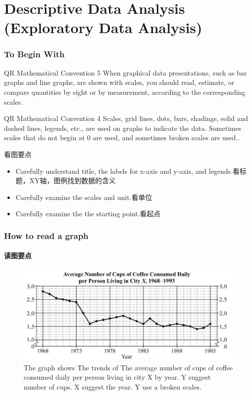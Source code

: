 \documentclass[
	11pt, %
	handout,
]{beamer}
\begin{document}

\section{Descriptive Data Analysis (Exploratory Data Analysis)}

\begin{frame}
	\frametitle{To Begin With} %

	\begin{block}{QR Mathematical Convention 5}
		When graphical data presentations, such as bar graphs and line graphs,
are shown with scales, you should read, estimate, or compare quantities
by sight or by measurement, according to the corresponding scales.
	\end{block}

		\begin{block}{QR Mathematical Convention 4}
		Scales, grid lines, dots, bars, shadings, solid and dashed lines, legends,
etc., are used on graphs to indicate the data. Sometimes scales that do not
begin at 0 are used, and sometimes broken scales are used..
	\end{block}
	\begin{alertblock}{看图要点}
		\begin{itemize}
			\item Carefully understand title, the labels for x-axis and y-axis, and legends.看标题，XY轴，图例找到数据的含义
			\item Carefully examine the scales and unit.看单位
			\item Carefully examine the the starting point.看起点
		\end{itemize}
	\end{alertblock}
\end{frame}


\begin{frame}
	\frametitle{How to read a graph} %
	\framesubtitle{读图要点}
	\begin{figure}
		\includegraphics[width=0.8\linewidth]{Graph.png}
		\caption{The graph shows The trends of The average number of cups of coffee consumed daily
per person living in city X by year. Y suggest number of cups. X suggest the year. Y use a broken scales.}
	\end{figure}
\end{frame}
\end{document}
